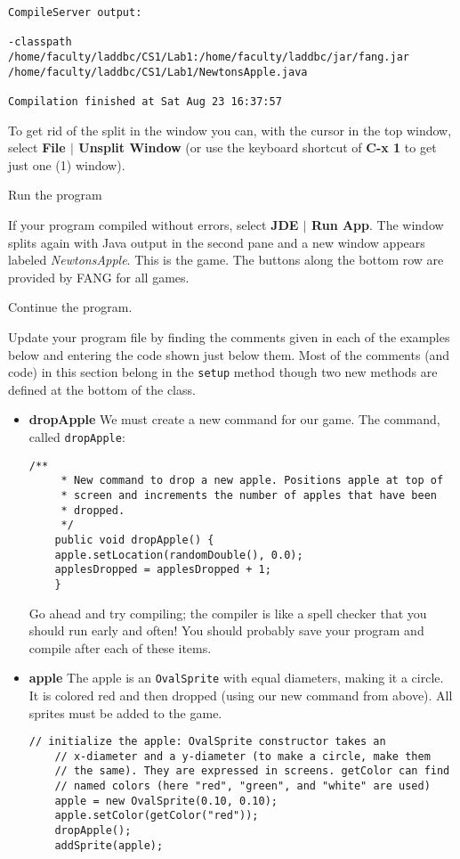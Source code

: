 \documentclass[12pt,twoside]{memoir}
\newcommand\code[1]{\lstinline^#1^}
\newcounter{ProgrammingProblem}
\newenvironment{LabExercises}{%
\renewcommand{\ExerciseListName}{Question}%
\renewcommand{\ExerciseListHeader}{\textbf{%
   Checkpoint\ExerciseHeaderNB. }}
\begin{ExerciseList}}%
{\end{ExerciseList}}
\newcommand{\LabExercise}{\Exercise[name={Lab Phase\ExerciseHeaderNB},counter={ProgrammingProblem}]}
\begin{document}
\begin{LabExercises}
\begin{lstlisting}[numbers=none]
CompileServer output:

-classpath /home/faculty/laddbc/CS1/Lab1:/home/faculty/laddbc/jar/fang.jar 
/home/faculty/laddbc/CS1/Lab1/NewtonsApple.java

Compilation finished at Sat Aug 23 16:37:57
\end{lstlisting}

To get rid of the split in the window you can, with the cursor in the
top window, select \textbf{File $|$ Unsplit Window} (or use the
keyboard shortcut of \textbf{C-x 1} to get just one (1) window). 

\LabExercise Run the program

If your program compiled without errors, select \textbf{JDE $|$ Run
  App}. The window splits again with Java output in the second pane
and a new window appears labeled \emph{NewtonsApple}. This is the
game. The buttons along the bottom row are provided by FANG for all
games.

\LabExercise Continue the program.

Update your program file by finding the comments given in each of the
examples below and entering the code shown just below them. Most of the
comments (and code) in this section belong in the \code{setup} method
though two new methods are defined at the bottom of the class.
\newpage
\begin{itemize}
\item \textbf{dropApple} We must create a new command for our
  game. The command, called \code{dropApple}:
\begin{lstlisting}[numbers=none]
    /**
     * New command to drop a new apple. Positions apple at top of
     * screen and increments the number of apples that have been
     * dropped.
     */
    public void dropApple() {
	apple.setLocation(randomDouble(), 0.0);
	applesDropped = applesDropped + 1;
    }
\end{lstlisting}

Go ahead and try compiling; the compiler is like a spell checker that
you should run early and often! You should probably save your program
and compile after each of these items.

\item \textbf{apple} The apple is an \code{OvalSprite} with equal
  diameters, making it a circle. It is colored red and then dropped
  (using our new command from above). All sprites must be added to the
  game.
\begin{lstlisting}[numbers=none]
	// initialize the apple: OvalSprite constructor takes an
	// x-diameter and a y-diameter (to make a circle, make them
	// the same). They are expressed in screens. getColor can find
	// named colors (here "red", "green", and "white" are used)
	apple = new OvalSprite(0.10, 0.10);
	apple.setColor(getColor("red"));
	dropApple();
	addSprite(apple);
\end{lstlisting}


\end{itemize}
\end{LabExercises}
\end{document}
